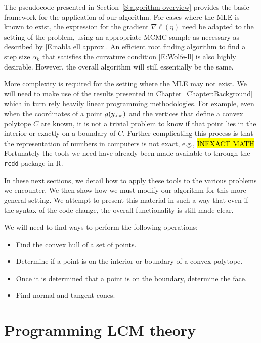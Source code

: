 The pseudocode presented in Section~\ref{S:algorithm overview} provides the basic framework for the application of our algorithm.
For cases where the MLE is known to exist, the expression for the gradient $\nabla \ell(\eta)$ need be adapted to the setting of the problem, using an appropriate MCMC sample as necessary as described by \eqref{E:nabla ell approx}.  An efficient
root finding algorithm to find a step size $\alpha_k$ that satisfies the curvature
condition \eqref{E:Wolfe-ll} is also highly desirable.  However, the overall algorithm
will still essentially be the same.

More complexity is required for the setting where the MLE may not exist.  We will need 
to make use of the results presented in Chapter~\ref{Chapter:Background} which in turn 
rely heavily linear programming methodologies.  For example, even when the coordinates 
of a point $g(y_{\textrm{obs}})$ and the vertices that define a convex polytope $C$ are known, it 
is not a trivial problem to know if that point lies in the interior or exactly on 
a boundary of $C$.  Further complicating this process is that the representation of 
numbers in computers is not exact, e.g., \hl{INEXACT MATH}
Fortunately the tools we need have already been made available to through the \texttt{rcdd} package \citep{rcdd:R} in R.

In these next sections, we detail how to apply these tools to the various problems we encounter.  We then show how we must modify our algorithm for this more general setting.
We attempt to present this material in such a way that even if the syntax of the 
code change, the overall functionality is still made clear.

We will need to find ways to perform the following operations:
\begin{itemize}
\item Find the convex hull of a set of points.
\item Determine if a point is on the interior or boundary of a convex polytope.
\item Once it is determined that a point is on the boundary, determine the face.
\item Find normal and tangent cones.
\end{itemize}
\section{Programming LCM theory}
 \citep{rcdd}

